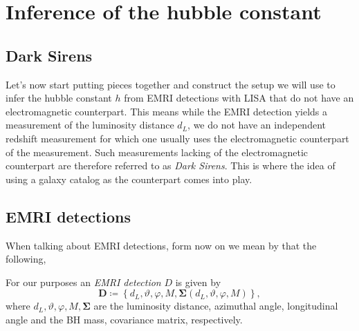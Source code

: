 \chapter{Inference of the hubble constant}

\section{Dark Sirens}

Let's now start putting pieces together and construct the setup we will use to infer the hubble constant $h$ from EMRI detections with LISA that do not have an electromagnetic counterpart. This means while the EMRI detection yields a measurement of the luminosity distance $d_L$, we do not have an independent redshift measurement for which one usually uses the electromagnetic counterpart of the measurement. Such measurements lacking of the electromagnetic counterpart are therefore referred to as \emph{Dark Sirens}. This is where the idea of using a galaxy catalog as the counterpart comes into play.

\section{EMRI detections}

When talking about EMRI detections, form now on we mean by that the following,
\begin{definition}
    For our purposes an \emph{EMRI detection} $D$ is given by
    \begin{equation}
        \label{eq:emri-detection}
        \bm{D} \coloneqq \left \{ d_L, \vartheta, \varphi, M, \bm{\Sigma} (d_L, \vartheta, \varphi, M)\right \},
    \end{equation}
    where $d_L, \vartheta, \varphi, M, \bm{\Sigma}$ are the luminosity distance, azimuthal angle, longitudinal angle and the BH mass, covariance matrix, respectively.
\end{definition}
